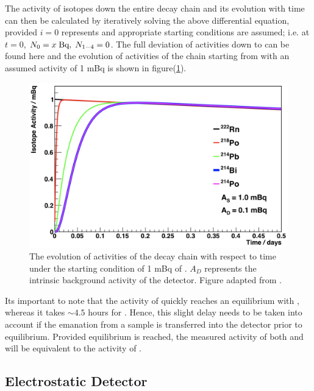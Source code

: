 The activity of isotopes down the entire decay chain and its evolution with time can then be calculated by iteratively solving the above differential equation, provided $i=0$ represents \RnTTT{} and appropriate starting conditions are assumed; i.e. at $t=0$, $N_{0}= x \; \text{Bq}, \; N_{1-4} = 0$. The full deviation of activities down to \PoTOF{} can be found here \cite{mott_2013} and the evolution of activities of the chain starting from \RnTTT{} with an assumed activity of 1 mBq is shown in figure(\ref{fig:radon_chain_activity_evolution}).
%
\begin{figure}[t!]
    \centering
    \includegraphics[scale=0.40]{Chapter_4/Figures/radon_chain_activities.png}
    \caption[The evolution of activities of the \RnTTT{} decay chain with respect to time under the starting condition of 1 mBq of \RnTTT{}.]
    {The evolution of activities of the \RnTTT{} decay chain with respect to time under the starting condition of 1 mBq of \RnTTT{}. $A_{D}$ represents the intrinsic background activity of the detector. Figure adapted from \cite{mott_2013}.}
    \label{fig:radon_chain_activity_evolution}
\end{figure}
%
Its important to note that the activity of \PoTOE{} quickly reaches an equilibrium with \RnTTT{}, whereas it takes $\sim4.5$ hours for \PoTOF{}. Hence, this slight delay needs to be taken into account if the emanation from a sample is transferred into the detector prior to equilibrium. Provided equilibrium is reached, the measured activity of both \PoTOE{} and \PoTOF{} will be equivalent to the activity of \RnTTT{}.


\newpage
\subsection{Electrostatic Detector}
\label{secsec:electrostatic_detector}


